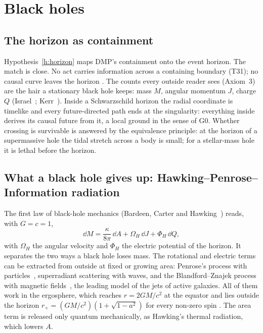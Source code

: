 \section{Black holes}\label{sec:bh}

\subsection{The horizon as containment}

Hypothesis~\ref{h:horizon} maps DMP's containment onto the event horizon. The match is close. No act carries information across a containing
boundary (T31); no causal curve leaves the horizon \tagP. The counts every outside reader sees (Axiom~3) are the hair a stationary black hole
keeps: mass $M$, angular momentum $J$, charge $Q$ (Israel~\cite{israel}; Kerr~\cite{kerr}). Inside a Schwarzschild horizon the radial
coordinate is timelike and every future-directed path ends at the singularity: everything inside derives its causal future from it, a
local ground in the sense of G0. Whether crossing is survivable is answered by the equivalence principle: at the horizon of a
supermassive hole the tidal stretch across a body is small; for a stellar-mass hole it is lethal before the horizon.

\subsection{What a black hole gives up: Hawking--Penrose--Information radiation}

The first law of black-hole mechanics (Bardeen, Carter and Hawking~\cite{bch}) reads, with $G=c=1$,
\begin{equation}\label{eq:firstlaw}
\dd M=\frac{\kappa}{8\pi}\,\dd A+\Omega_H\,\dd J+\Phi_H\,\dd Q ,
\end{equation}
with $\Omega_H$ the angular velocity and $\Phi_H$ the electric potential of the horizon. It separates the two ways a black hole loses mass.
The rotational and electric terms can be extracted from outside at fixed or growing area: Penrose's process with particles~\cite{penrose69},
superradiant scattering with waves, and the Blandford--Znajek process with magnetic fields~\cite{bz}, the leading model of the jets of
active galaxies. All of them work in the ergosphere, which reaches $r=2GM/c^2$ at the equator and lies outside the horizon
$r_+=(GM/c^2)(1+\sqrt{1-a^2})$ for every non-zero spin . The area term is released only quantum mechanically, as Hawking's thermal
radiation, which lowers $A$.


